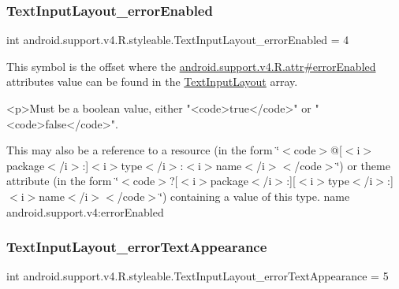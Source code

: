 \subsubsection{\texorpdfstring{Text\+Input\+Layout\+\_\+error\+Enabled}{TextInputLayout\_errorEnabled}}
{\footnotesize\ttfamily int android.\+support.\+v4.\+R.\+styleable.\+Text\+Input\+Layout\+\_\+error\+Enabled = 4\hspace{0.3cm}{\ttfamily [static]}}

This symbol is the offset where the \hyperlink{classandroid_1_1support_1_1v4_1_1R_1_1attr_aeef469d93380b66cf16047dc17b8399c}{android.\+support.\+v4.\+R.\+attr\#error\+Enabled} attribute\textquotesingle{}s value can be found in the \hyperlink{classandroid_1_1support_1_1v4_1_1R_1_1styleable_a86943debf88d7a9dc4c0627a8546913d}{Text\+Input\+Layout} array.

\begin{DoxyVerb}      <p>Must be a boolean value, either "<code>true</code>" or "<code>false</code>".
\end{DoxyVerb}
 

This may also be a reference to a resource (in the form \char`\"{}$<$code$>$@\mbox{[}$<$i$>$package$<$/i$>$\+:\mbox{]}$<$i$>$type$<$/i$>$\+:$<$i$>$name$<$/i$>$$<$/code$>$\char`\"{}) or theme attribute (in the form \char`\"{}$<$code$>$?\mbox{[}$<$i$>$package$<$/i$>$\+:\mbox{]}\mbox{[}$<$i$>$type$<$/i$>$\+:\mbox{]}$<$i$>$name$<$/i$>$$<$/code$>$\char`\"{}) containing a value of this type.  name android.\+support.\+v4\+:error\+Enabled \mbox{\label{classandroid_1_1support_1_1v4_1_1R_1_1styleable_af9ca4eaf2eb93f555c4c269831af4712}} 
\subsubsection{\texorpdfstring{Text\+Input\+Layout\+\_\+error\+Text\+Appearance}{TextInputLayout\_errorTextAppearance}}
{\footnotesize\ttfamily int android.\+support.\+v4.\+R.\+styleable.\+Text\+Input\+Layout\+\_\+error\+Text\+Appearance = 5\hspace{0.3cm}{\ttfamily [static]}}

